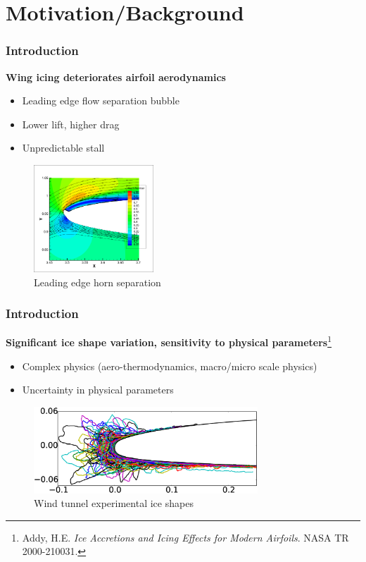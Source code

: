 \documentclass[9pt]{beamer}
\begin{document}
\section{Motivation/Background}
\label{sec-1}
\begin{frame}
\frametitle{Introduction}
\label{sec-1-1}

\textbf{Wing icing deteriorates airfoil aerodynamics}
\begin{itemize}
\item Leading edge flow separation bubble
\item Lower lift, higher drag
\item Unpredictable stall
\end{itemize}

\vspace*{-0.0cm}\begin{figure}
    \includegraphics[width=0.4\textwidth]{BadHorn.png}
    \caption{Leading edge horn separation}
\end{figure}
\end{frame}
\begin{frame}
\frametitle{Introduction}
\label{sec-1-2}

\textbf{Significant ice shape variation, sensitivity to physical parameters}\footnote{Addy, H.E. \emph{Ice Accretions and Icing Effects for Modern Airfoils}. NASA TR 2000-210031.
 }
\begin{itemize}
\item Complex physics (aero-thermodynamics, macro/micro scale physics)
\item Uncertainty in physical parameters
\end{itemize}

\vspace*{-0.0cm}\begin{figure}
      \includegraphics[width=0.75\textwidth]{GlobalDataSet}
      \caption{Wind tunnel experimental ice shapes}
\end{figure}
\end{frame}
\end{document}
